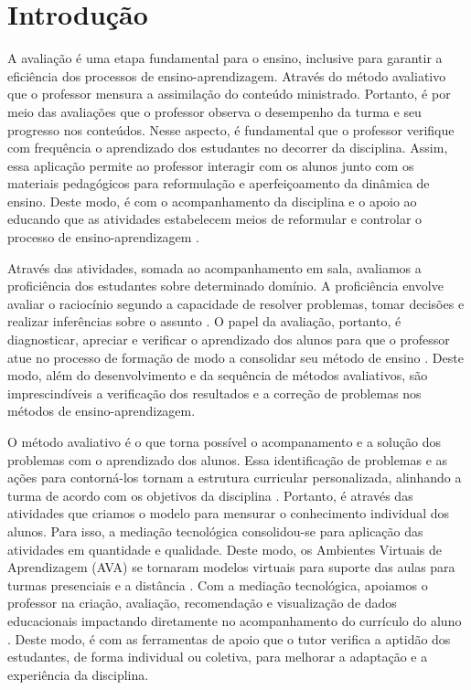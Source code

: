 \chapter{Introdução}
\label{cap1-intro}

A avaliação é uma etapa fundamental para o ensino, inclusive para garantir a eficiência dos processos de ensino-aprendizagem. Através do método avaliativo que o professor mensura a assimilação do conteúdo ministrado. Portanto, é por meio das avaliações que o professor observa o desempenho da turma e seu progresso nos conteúdos. Nesse aspecto, é fundamental que o professor verifique com frequência o aprendizado dos estudantes no decorrer da disciplina. Assim, essa aplicação permite ao professor interagir com os alunos junto com os materiais pedagógicos para reformulação e aperfeiçoamento da dinâmica de ensino. Deste modo, é com o acompanhamento da disciplina e o apoio ao educando que as atividades estabelecem meios de reformular e controlar o processo de ensino-aprendizagem \cite{barreira2006}.


Através das atividades, somada ao acompanhamento em sala, avaliamos a proficiência dos estudantes sobre determinado domínio. A proficiência envolve avaliar o raciocínio segundo a capacidade de resolver problemas, tomar decisões e realizar inferências sobre o assunto \cite{casiraghi2017}. O papel da avaliação, portanto, é diagnosticar, apreciar e verificar o aprendizado dos alunos para que o professor atue no processo de formação de modo a consolidar seu método de ensino \cite{oliveira2005}. Deste modo, além do desenvolvimento e da sequência de métodos avaliativos, são imprescindíveis a verificação dos resultados e a correção de problemas nos métodos de ensino-aprendizagem.


O método avaliativo é o que torna possível o acompanamento e a solução dos problemas com o aprendizado dos alunos. Essa identificação de problemas e as ações para contorná-los tornam a estrutura curricular personalizada, alinhando a turma de acordo com os objetivos da disciplina \cite{biggs1998}. Portanto, é através das atividades que criamos o modelo para mensurar o conhecimento individual dos alunos. Para isso, a mediação tecnológica consolidou-se para aplicação das atividades em quantidade e qualidade. Deste modo, os Ambientes Virtuais de Aprendizagem (AVA) \cite{maquine2020} se tornaram modelos virtuais para suporte das aulas para turmas presenciais e a distância \cite{raes2020}. Com a mediação tecnológica, apoiamos o professor na criação, avaliação, recomendação e visualização de dados educacionais impactando diretamente no acompanhamento do currículo do aluno \cite{paiva2012}. Deste modo, é com as ferramentas de apoio que o tutor verifica a aptidão dos estudantes, de forma individual ou coletiva, para melhorar a adaptação e a experiência da disciplina.

